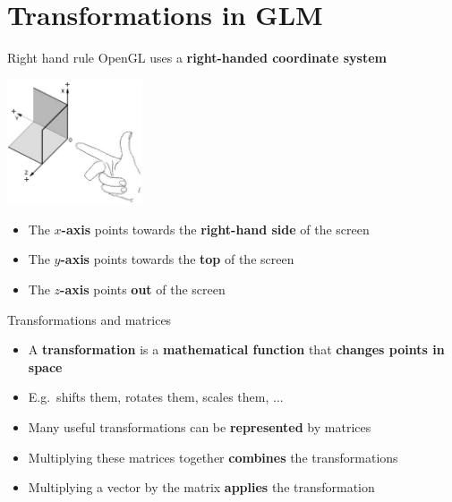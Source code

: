 \part{Transformations in GLM}
\frame{\partpage}

\begin{frame}{Right hand rule}
	\pause OpenGL uses a \textbf{right-handed coordinate system}
	\pause \begin{center}
		\includegraphics[width=0.3\textwidth]{RightHandRule}
	\end{center}
	\begin{itemize}
		\pause\item The \textbf{$x$-axis} points towards the \textbf{right-hand side} of the screen
		\pause\item The \textbf{$y$-axis} points towards the \textbf{top} of the screen
		\pause\item The \textbf{$z$-axis} points \textbf{out} of the screen
	\end{itemize}
\end{frame}

\begin{frame}{Transformations and matrices}
	\begin{itemize}
		\pause\item A \textbf{transformation} is a \textbf{mathematical function} that \textbf{changes points in space}
		\pause\item E.g.\ shifts them, rotates them, scales them, ...
		\pause\item Many useful transformations can be \textbf{represented} by matrices
		\pause\item Multiplying these matrices together \textbf{combines} the transformations
		\pause\item Multiplying a vector by the matrix \textbf{applies} the transformation
	\end{itemize}
\end{frame}

